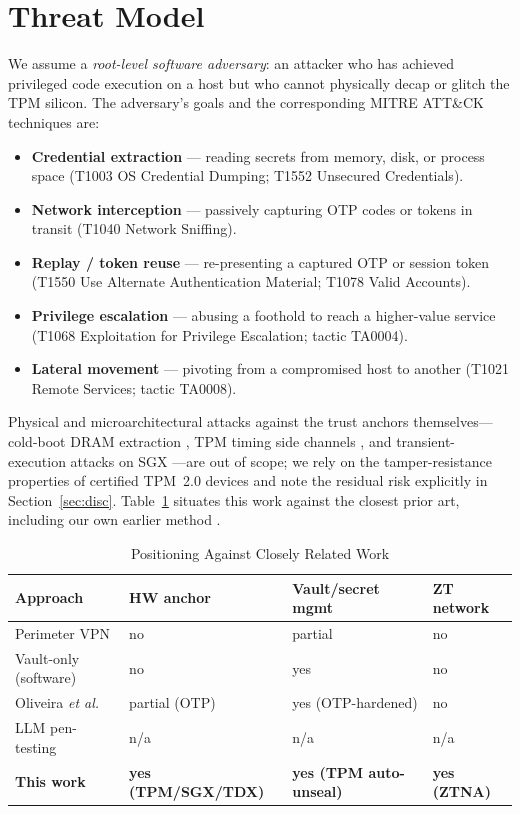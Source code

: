 \documentclass[journal]{IEEEtran}
\begin{document}
\section{Threat Model}\label{sec:threat}
We assume a \emph{root-level software adversary}: an attacker who has achieved
privileged code execution on a host but who cannot physically decap or
glitch the TPM silicon. The adversary's goals and the corresponding MITRE
ATT\&CK techniques \cite{mitre2024} are:
\begin{itemize}
\item \textbf{Credential extraction} --- reading secrets from memory, disk, or
process space (T1003 OS Credential Dumping; T1552 Unsecured Credentials).
\item \textbf{Network interception} --- passively capturing OTP codes or
tokens in transit (T1040 Network Sniffing).
\item \textbf{Replay / token reuse} --- re-presenting a captured OTP or session
token (T1550 Use Alternate Authentication Material; T1078 Valid Accounts).
\item \textbf{Privilege escalation} --- abusing a foothold to reach a
higher-value service (T1068 Exploitation for Privilege Escalation;
tactic TA0004).
\item \textbf{Lateral movement} --- pivoting from a compromised host to another
(T1021 Remote Services; tactic TA0008).
\end{itemize}
Physical and microarchitectural attacks against the trust anchors
themselves---cold-boot DRAM extraction \cite{halderman2008}, TPM timing side
channels \cite{moghimi2020tpmfail}, and transient-execution attacks on SGX
\cite{vanbulck2018foreshadow}---are out of scope; we rely on the
tamper-resistance properties of certified TPM~2.0 devices \cite{tcg2019} and
note the residual risk explicitly in Section~\ref{sec:disc}. Table~\ref{tab:related} situates this work against the
closest prior art, including our own earlier method \cite{oliveira2024}.

\begin{table}[!t]
\caption{Positioning Against Closely Related Work}
\label{tab:related}
\centering
\footnotesize
\begin{tabular}{@{}p{4.5cm}p{3cm}p{4cm}p{3cm}@{}}
\toprule
\textbf{Approach} & \textbf{HW anchor} & \textbf{Vault/secret mgmt} & \textbf{ZT network} \\
\midrule
Perimeter VPN            & no          & partial      & no \\
Vault-only (software)    & no          & yes          & no \\
Oliveira \emph{et al.}~\cite{oliveira2024} & partial (OTP) & yes (OTP-hardened) & no \\
LLM pen-testing~\cite{pentestgpt,happe2023,autoattacker} & n/a & n/a & n/a \\
\textbf{This work}       & \textbf{yes (TPM/SGX/TDX)} & \textbf{yes (TPM auto-unseal)} & \textbf{yes (ZTNA)} \\
\bottomrule
\end{tabular}
\end{table}
\end{document}

